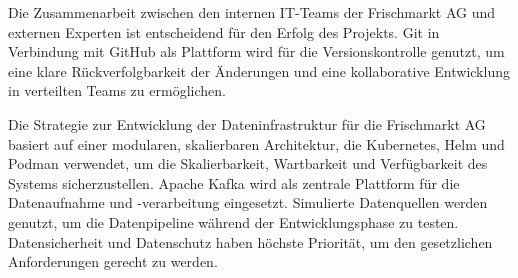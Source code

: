 \documentclass[%
pdftex,
oneside,			%
11pt,				%
parskip=half,		%
headheight = 12pt,	%
headsepline,		%
footsepline,		%
footheight = 16pt,	%
abstracton,		%
DIV=calc,		%
BCOR=8mm,		%
headinclude=false,	%
footinclude=false,	%
listof=totoc,		%
toc=bibliography,	%
]{scrreprt}	%
\begin{document}

    Die Zusammenarbeit zwischen den internen IT-Teams der Frischmarkt AG und externen Experten ist entscheidend für den Erfolg des Projekts.
    Git in Verbindung mit GitHub als Plattform wird für die Versionskontrolle genutzt, um eine klare Rückverfolgbarkeit der Änderungen und eine kollaborative Entwicklung in verteilten Teams zu ermöglichen.


    Die Strategie zur Entwicklung der Dateninfrastruktur für die Frischmarkt AG basiert auf einer modularen, skalierbaren Architektur, die Kubernetes, Helm und Podman verwendet, um die Skalierbarkeit, Wartbarkeit und Verfügbarkeit des Systems sicherzustellen.
    Apache Kafka wird als zentrale Plattform für die Datenaufnahme und -verarbeitung eingesetzt.
    Simulierte Datenquellen werden genutzt, um die Datenpipeline während der Entwicklungsphase zu testen.
    Datensicherheit und Datenschutz haben höchste Priorität, um den gesetzlichen Anforderungen gerecht zu werden.




\end{document}
